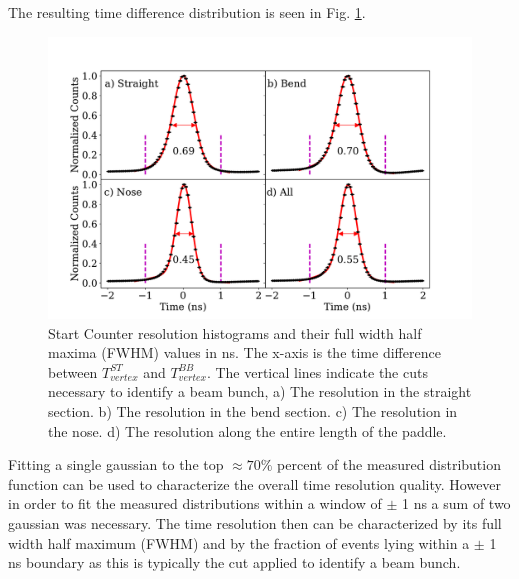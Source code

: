 The resulting time difference distribution is seen in Fig. \ref{fig:st_time_res}.
	\begin{figure}[!htb]
		\centering
		\includegraphics[width=1.08\linewidth]{performance/figs/TR_2gaussian}
		\caption{Start Counter  resolution  histograms and their full width half maxima (FWHM) values in ns.  The x-axis is the time difference between $T^{ST}_{vertex}$ and $T^{BB}_{vertex}$. The vertical lines indicate the cuts necessary to identify a beam bunch, a) The resolution in the straight section. b) The resolution in the bend section. c) The resolution in the nose. d) The resolution along the entire length of the paddle. }
		\label{fig:st_time_res}
	\end{figure}
Fitting a single gaussian to the top $\approx 70\%$ percent of the measured distribution function can be used to characterize the overall time resolution quality. However in order to fit the measured distributions within a window of $\pm$ 1 ns a sum of two gaussian was necessary. The time resolution then can be characterized by its full width half maximum (FWHM) and by the fraction of events lying within a $\pm$ 1 ns boundary as this is typically the cut applied to identify a beam bunch.  

